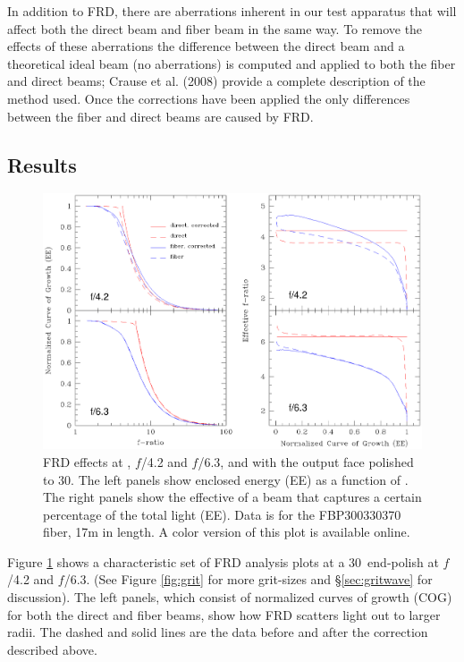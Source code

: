 In addition to FRD, there are aberrations inherent in our test
apparatus that will affect both the direct beam and fiber beam in the
same way. To remove the effects of these aberrations the difference
between the direct beam and a theoretical ideal beam (no aberrations)
is computed and applied to both the fiber and direct beams; Crause et
al. (2008)\cite{Crause_08} provide a complete description of the
method used. Once the corrections have been applied the only
differences between the fiber and direct beams are caused by FRD.

\subsection{Results}
\label{sec:results}

\begin{figure}[ht]
\begin{center}
\includegraphics[width=\textwidth, trim=0 2.6in 0 0, clip=true]{FRD/figs/basic_FRD.eps}
\caption{\label{fig:basicFRD} FRD effects at \filty, $f$/4.2 and
  $f$/6.3, and with the output face polished to 30\mum. The left
  panels show enclosed energy (EE) as a function of \fratio. The right
  panels show the effective \fratio of a beam that captures a certain
  percentage of the total light (EE). Data is for the FBP300330370
  fiber, 17m in length. A color version of this plot is available online.}
\end{center}
\end{figure}

Figure \ref{fig:basicFRD} shows a characteristic set of FRD analysis
plots at a 30\mum\ end-polish at $f$/4.2 and $f$/6.3.  (See Figure
\ref{fig:grit} for more grit-sizes and \S\ref{sec:gritwave} for
discussion).  The left panels, which consist of normalized curves of
growth (COG) for both the direct and fiber beams, show how FRD
scatters light out to larger radii. The dashed and solid lines are the
data before and after the correction described above\cite{Crause_08}.

